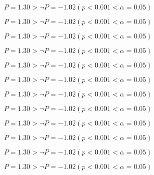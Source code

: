 \documentclass{article}
\begin{document}
    \begin{card}[note][H2.2 vérifiée]
        $P = 1.30 > \neg P = -1.02 (p < 0.001 < \alpha = 0.05)$  
    \end{card}

    \begin{card}[note]
        $P = 1.30 > \neg P = -1.02 (p < 0.001 < \alpha = 0.05)$  
    \end{card}
    
    \begin{card}[check][H2.2 vérifiée]
        $P = 1.30 > \neg P = -1.02 (p < 0.001 < \alpha = 0.05)$  
    \end{card}

    \begin{card}[check]
        $P = 1.30 > \neg P = -1.02 (p < 0.001 < \alpha = 0.05)$  
    \end{card}
    
    \begin{card}[info][H2.2 vérifiée]
        $P = 1.30 > \neg P = -1.02 (p < 0.001 < \alpha = 0.05)$  
    \end{card}

    \begin{card}[info]
        $P = 1.30 > \neg P = -1.02 (p < 0.001 < \alpha = 0.05)$  
    \end{card}
    
    \begin{card}[warning][H2.2 vérifiée]
        $P = 1.30 > \neg P = -1.02 (p < 0.001 < \alpha = 0.05)$  
    \end{card}

    \begin{card}[warning]
        $P = 1.30 > \neg P = -1.02 (p < 0.001 < \alpha = 0.05)$  
    \end{card}
    
    \begin{card}[error][H2.2 vérifiée]
        $P = 1.30 > \neg P = -1.02 (p < 0.001 < \alpha = 0.05)$  
    \end{card}

    \begin{card}[error]
        $P = 1.30 > \neg P = -1.02 (p < 0.001 < \alpha = 0.05)$  
    \end{card}
    
    \begin{card}[idea][H2.2 vérifiée]
        $P = 1.30 > \neg P = -1.02 (p < 0.001 < \alpha = 0.05)$  
    \end{card}

    \begin{card}[idea]
        $P = 1.30 > \neg P = -1.02 (p < 0.001 < \alpha = 0.05)$  
    \end{card}
    
        
\end{document}
